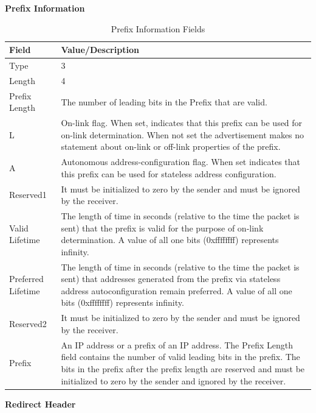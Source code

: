 \documentclass[12pt]{article}
\begin{document}
\textbf{Prefix Information}\\

\begin{savenotes}
\begin{table}[!htpb]
\centering
\begin{tabular}{|L{3.0cm}|L{11.6cm}|}
\hline
Field&Value/Description\\
\hline
Type&3\\
\hline
Length&4\\
\hline
Prefix Length&The number of leading bits in the Prefix that are valid.\\
\hline
L&On-link flag. When set, indicates that this prefix can be used for on-link determination. When not set the advertisement makes no statement about on-link or off-link properties of the prefix.\\
\hline
A&Autonomous address-configuration flag. When set indicates that this prefix can be used for stateless address configuration.\\
\hline
Reserved1&It must be initialized to zero by the sender and must be ignored by the receiver.\\
\hline
Valid Lifetime&The length of time in seconds (relative to the time the packet is sent) that the prefix is valid for the purpose of on-link determination. A value of all one bits (0xffffffff) represents infinity.\\
\hline
Preferred Lifetime&The length of time in seconds (relative to the time the packet is sent) that addresses generated from the prefix via stateless address autoconfiguration remain preferred. A value of all one bits 
(0xffffffff) represents infinity.\\
\hline
Reserved2&It must be initialized to zero by the sender and must be ignored by the receiver.\\
\hline
Prefix&An IP address or a prefix of an IP address. The Prefix Length field contains the number of valid leading bits in the prefix. The bits in the prefix after the prefix length are reserved and must be initialized to 
zero by the sender and ignored by the receiver.\\
\hline
\end{tabular}
\caption{Prefix Information Fields}
\label{table:prefixInfo}
\end{table}
\end{savenotes}


\textbf{Redirect Header}\\
\end{document}
